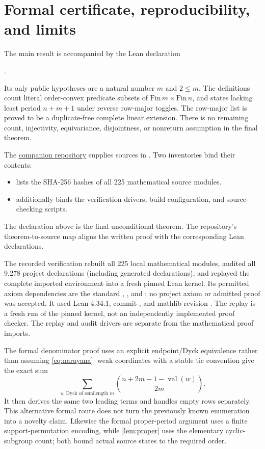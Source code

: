 \section{Formal certificate, reproducibility, and limits}\label{sec:certificate}
The main result is accompanied by the Lean declaration
\begin{center}
.
\end{center}
Its only public hypotheses are a natural number $m$ and $2\le m$. The definitions count literal order-convex predicate subsets of $\mathrm{Fin}\,m\times\mathrm{Fin}\,n$, and states lacking least period $n+m+1$ under reverse row-major toggles. The row-major list is proved to be a duplicate-free complete linear extension. There is no remaining count, injectivity, equivariance, disjointness, or nonreturn assumption in the final theorem.

The \href{https://github.com/ColumbusLabs/interval-closed-rowmotion}{companion repository} supplies sources in . Two inventories bind their contents:
\begin{itemize}
\item {} lists the SHA-256 hashes of all 225 mathematical source modules.
\item {} additionally binds the verification drivers, build configuration, and source-checking scripts.
\end{itemize}
The declaration above is the final unconditional theorem. The repository's theorem-to-source map aligns the written proof with the corresponding Lean declarations.

The recorded verification rebuilt all 225 local mathematical modules, audited all 9,278 project declarations (including generated declarations), and replayed the complete imported environment into a fresh pinned Lean kernel. Its permitted axiom dependencies are the standard , , and ; no project axiom or admitted proof was accepted. It used Lean 4.34.1, commit , and mathlib revision . The replay is a fresh run of the pinned kernel, not an independently implemented proof checker. The replay and audit drivers are separate from the mathematical proof imports.

The formal denominator proof uses an explicit endpoint/Dyck equivalence rather than assuming \eqref{eq:narayana}: weak coordinates with a stable tie convention give the exact sum
\[
 \sum_{w\text{ Dyck of semilength }m}
 \binom{n+2m-1-\operatorname{val}(w)}{2m}.
\]
It then derives the same two leading terms and handles empty rows separately. This alternative formal route does not turn the previously known enumeration into a novelty claim. Likewise the formal proper-period argument uses a finite support-permutation encoding, while \cref{lem:proper} uses the elementary cyclic-subgroup count; both bound actual source states to the required order.


